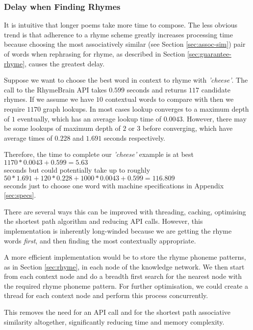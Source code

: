 \subsubsection{Delay when Finding Rhymes}

It is intuitive that longer poems take more time to compose. The less obvious trend is that adherence to a rhyme scheme greatly increases processing time because choosing the most associatively similar (see Section \ref{sec:assoc-sim}) pair of words when rephrasing for rhyme, as described in Section \ref{sec:guarantee-rhyme}, causes the greatest delay.

Suppose we want to choose the best word in context to rhyme with \textit{'cheese'}. The call to the RhymeBrain API\cite{rhymebrain} takes $0.599$ seconds and returns $117$ candidate rhymes. If we assume we have $10$ contextual words to compare with then we require $1170$ graph lookups. In most cases lookup converges to a maximum depth of $1$ eventually, which has an average lookup time of $0.0043$. However, there may be some lookups of maximum depth of $2$ or $3$ before converging, which have average times of $0.228$ and $1.691$ seconds respectively. 

Therefore, the time to complete our \textit{'cheese'} example is at best\\ $1170*0.0043 + 0.599  = 5.63$\\ seconds but could potentially take up to roughly\\ $50*1.691 + 120*0.228 + 1000*0.0043 + 0.599  = 116.809$\\ seconds just to choose one word with machine specifications in Appendix \ref{sec:specs}.

There are several ways this can be improved with threading, caching, optimising the shortest path algorithm and reducing API calls. However, this implementation is inherently long-winded because we are getting the rhyme words \textit{first}, and then finding the most contextually appropriate. 

A more efficient implementation would be to store the rhyme phoneme patterns, as in Section \ref{sec:rhyme}, in each node of the knowledge network. We then start from each context node and do a breadth first search for the nearest node with the required rhyme phoneme pattern. For further optimisation, we could create a thread for each context node and perform this process concurrently.

This removes the need for an API call and for the shortest path associative similarity altogether, significantly reducing time and memory complexity.

